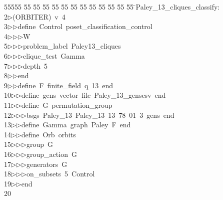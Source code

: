 %
%
\begin{tabbing}
55555 \= 55 \= 55 \= 55 \= 55 \= 55 \= 55 \= 55 \= 55 \= 55 \= 55 \= 55 \= 55 \= \>Paley\_13\_cliques\_classify:\\[0pt]
2\>$\triangleright$\>(ORBITER)\ v\ 4\ \\[0pt]
3\>$\triangleright$\>$\triangleright$\>define\ Control\ poset\_classification\_control\ \\[0pt]
4\>$\triangleright$\>$\triangleright$\>$\triangleright$\>W\ \\[0pt]
5\>$\triangleright$\>$\triangleright$\>$\triangleright$\>problem\_label\ Paley13\_cliques\ \\[0pt]
6\>$\triangleright$\>$\triangleright$\>$\triangleright$\>clique\_test\ Gamma\ \\[0pt]
7\>$\triangleright$\>$\triangleright$\>$\triangleright$\>depth\ 5\ \\[0pt]
8\>$\triangleright$\>$\triangleright$\>end\ \\[0pt]
9\>$\triangleright$\>$\triangleright$\>define\ F\ finite\_field\ q\ 13\ end\ \\[0pt]
10\>$\triangleright$\>$\triangleright$\>define\ gens\ vector\ file\ Paley\_13\_genscsv\ end\ \\[0pt]
11\>$\triangleright$\>$\triangleright$\>define\ G\ permutation\_group\ \\[0pt]
12\>$\triangleright$\>$\triangleright$\>$\triangleright$\>bsgs\ Paley\_13\ Paley\_13\ 13\ 78\ 01\ 3\ gens\ end\ \\[0pt]
13\>$\triangleright$\>$\triangleright$\>define\ Gamma\ graph\ Paley\ F\ end\ \\[0pt]
14\>$\triangleright$\>$\triangleright$\>define\ Orb\ orbits\ \\[0pt]
15\>$\triangleright$\>$\triangleright$\>$\triangleright$\>group\ G\ \\[0pt]
16\>$\triangleright$\>$\triangleright$\>$\triangleright$\>group\_action\ G\ \\[0pt]
17\>$\triangleright$\>$\triangleright$\>$\triangleright$\>generators\ G\ \\[0pt]
18\>$\triangleright$\>$\triangleright$\>$\triangleright$\>on\_subsets\ 5\ Control\ \\[0pt]
19\>$\triangleright$\>$\triangleright$\>end\ \\[0pt]
20\>\end{tabbing}
